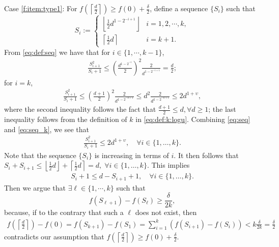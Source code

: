 \documentclass[onecolumn,letterpaper]{IEEEtran}
\newcommand{\fgap}{{\delta}}
\newcommand{\seq}{{S}}
\newcommand{\ups}{{\upsilon}}
\newcommand{\logu}{{k}}
\newcommand{\ind}{{i}}
\newcommand{\exiind}{{\ell}}
\begin{document}
Case \ref{f:item:type1}: For $f\left(\left\lceil \frac {d} {2}\right \rceil\right)\geq f(0)+\frac {\fgap}{2}$, define a sequence $\{\seq_{\ind}\}$ such that 
\begin{equation} \label{eq:def:seq}
    \seq_\ind := 
    \left\{
    \begin{array}{ll}
    \left\lfloor \frac{1}{2} d^{1-2^{-\ind+1}} \right\rfloor & \ind = 1,2,\cdots,\logu, \\
    \left\lceil \frac{1}{2} d\right\rceil & \ind = \logu+1.
    \end{array} 
    \right.
\end{equation}
From \eqref{eq:def:seq} we have that for $\ind \in \{1,\cdots,\logu-1\}$, 
\begin{align}
    \frac{\seq_{\ind+1}^2}{\seq_{\ind}+1} \le \left( \frac{d^{1-2^{-\ind}}}{2} \right)^2 \frac{2}{d^{1-2^{-\ind+1}}} = \frac{d}{2}; \label{eq:seq}
\end{align}
for $\ind = \logu$,
\begin{align}
    \frac{\seq_{\ind+1}^2}{\seq_{\ind}+1} \le \left( \frac{d+1}{2} \right)^2 \frac{2}{d^{1-2^{-\logu+1}}} \le d^2 \frac{2}{d^{1-2^{-\logu+1}}} \leq 2d^{1+\ups}, \label{eq:seq_k}
\end{align}
where the second inequality follows the fact that $\frac{d+1}{2}\leq d, \forall d\geq 1 $; the last inequality follows from the definition of $\logu$ in \eqref{eq:def:k:logu}.
Combining \eqref{eq:seq} and \eqref{eq:seq_k}, we see that 
\begin{align}
\label{eq:seq:ratio}
    \frac{\seq_{\ind+1}^2}{\seq_{\ind}+1}  \leq 2d^{1+\ups}, \quad\forall \ind\in \{1,\dots,\logu\}. 
\end{align}
Note that the sequence $\{\seq_{\ind}\}$ is increasing in terms of $\ind$. It then follows that $\seq_{\ind}+\seq_{\ind+1}\leq  \left\lfloor  \frac{1}{2} d\right\rfloor + \left\lceil \frac{1}{2} d\right\rceil=d, \;\forall \ind\in \{1,\dots,\logu\}$. This implies
\begin{align}
    \seq_{\ind}+1 \leq d-\seq_{\ind+1}+1, \quad\forall \ind\in \{1,\dots,\logu\}. \label{eq:remove:d-u+1}
\end{align}
Then we argue that $\exists\exiind \in \{ 1,\cdots,\logu \}$ such that
\begin{equation} 
\label{eq:seq:exiind}
    f(\seq_{\exiind+1}) - f(\seq_{\exiind}) \ge \frac{\fgap}{2\logu}, 
\end{equation}
because, if to the contrary that such a $\exiind$ does not exist, then  
\begin{align*}
   f\left( \left\lceil \frac{d}{2} \right\rceil \right) - f(0)=  f(\seq_{\logu+1}) - f(\seq_1) = \sum_{i=1}^k\left( f(\seq_{\ind+1}) - f(\seq_{\ind})\right) < k \frac{\fgap}{2\logu}=\frac{\fgap}{2}
\end{align*}
contradicts our assumption that $f\left(\left\lceil \frac {d} {2}\right \rceil\right)\geq f(0)+\frac {\fgap}{2}$.
\end{document}
